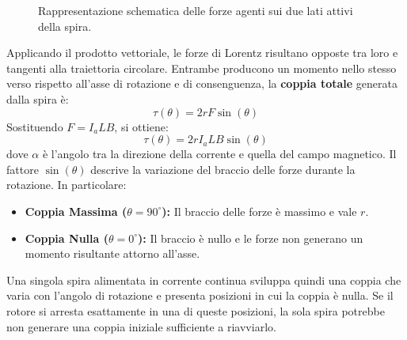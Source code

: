 ﻿\documentclass[11pt, a4paper]{article}
\begin{document}
\begin{figure}[H]
    \caption{Rappresentazione schematica delle forze agenti sui due lati attivi della spira.}
\end{figure}
\newpage
Applicando il prodotto vettoriale, le forze di Lorentz risultano opposte tra loro e tangenti alla traiettoria circolare. Entrambe producono un momento nello stesso verso rispetto all'asse di rotazione e di consenguenza, la \textbf{coppia totale} generata dalla spira è:
\[
    \tau(\theta) = 2rF\sin(\theta)
\]
Sostituendo \(F = I_a L B\), si ottiene:
\[
    \boxed{\tau(\theta) = 2r I_a L B \sin(\theta)}
\]
dove \(\alpha\) è l'angolo tra la direzione della corrente e quella del campo magnetico. Il fattore \(\sin(\theta)\) descrive la variazione del braccio delle forze durante la rotazione. In particolare:
\begin{itemize}
    \item \textbf{Coppia Massima (\(\theta = 90^\circ\)):} Il braccio delle forze è massimo e vale \(r\).
    \item \textbf{Coppia Nulla (\(\theta = 0^\circ\)):} Il braccio è nullo e le forze non generano un momento risultante attorno all'asse.
\end{itemize}
Una singola spira alimentata in corrente continua sviluppa quindi una coppia che varia con l'angolo di rotazione e presenta posizioni in cui la coppia è nulla. Se il rotore si arresta esattamente in una di queste posizioni, la sola spira potrebbe non generare una coppia iniziale sufficiente a riavviarlo.
\end{document}
